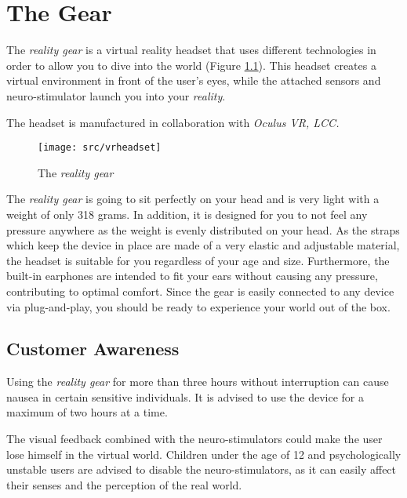 \chapter{The Gear}

The \emph{\poke{} reality gear} is a virtual reality headset that uses different technologies in order to allow you to dive into the \poke{} world (Figure \ref{headset}). This headset creates a virtual environment in front of the user's eyes, while the attached sensors and neuro-stimulator launch you into  your \emph{\poke{} reality}.\medskip

The headset is manufactured in collaboration with \emph{Oculus VR, LCC.}

\begin{figure}[!ht]
\begin{center}
\texttt{[image: src/vrheadset]}
\end{center}
\caption[The \emph{\pokeT{} reality gear}]{The \emph{\poke{} reality gear}}
\label{headset}
\end{figure}

The \emph{\poke{} reality gear} is going to sit perfectly on your head and is very light with a weight of only 318 grams. In addition, it is designed for you to not feel any pressure anywhere as the weight is evenly distributed on your head. As the straps which keep the device in place are made of a very elastic and adjustable material, the headset is suitable for you regardless of your age and size. Furthermore, the built-in earphones are  intended to fit your ears without causing any pressure, contributing to optimal comfort. Since the gear is easily connected to any device via plug-and-play, you should be ready to experience your \poke{} world out of the box.

\section{Customer Awareness}

Using the \emph{\poke{} reality gear} for more than three hours without interruption can cause nausea in certain sensitive individuals. It is advised to use the device for a maximum of two hours at a time. 

The visual feedback combined with the neuro-stimulators could make the user lose himself in the virtual world. Children under the age of 12 and psychologically unstable users are advised to disable the neuro-stimulators, as it can easily affect their senses and the perception of the real world. 


